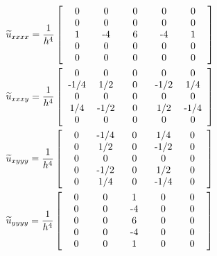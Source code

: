 \documentclass{article}
\begin{document}
\begin{align*}
& \widetilde u_{xxxx}=\frac{1}{h^4}\left[
	\begin{array}{p{0.7cm}<{\centering} p{0.7cm}<{\centering} p{0.7cm}<{\centering}p{0.7cm}<{\centering}p{0.7cm}<{\centering}}
		0&0&0&0&0\\
		0&0&0&0&0\\
		1&-4&6&-4&1\\
		0&0&0&0&0\\
		0&0&0&0&0\\
	\end{array}
	\right]\\
	& \widetilde u_{xxxy}=\frac{1}{h^4}\left[
	\begin{array}{p{0.7cm}<{\centering} p{0.7cm}<{\centering} p{0.7cm}<{\centering}p{0.7cm}<{\centering}p{0.7cm}<{\centering}}
		0&0&0&0&0\\
		-1/4&1/2&0&-1/2&1/4\\
		0&0&0&0&0\\
		1/4&-1/2&0&1/2&-1/4\\
		0&0&0&0&0\\
	\end{array}
	\right]\\
	& \widetilde u_{xyyy}=\frac{1}{h^4}\left[
	\begin{array}{p{0.7cm}<{\centering} p{0.7cm}<{\centering} p{0.7cm}<{\centering}p{0.7cm}<{\centering}p{0.7cm}<{\centering}}
		0&-1/4&0&1/4&0\\
		0&1/2&0&-1/2&0\\
		0&0&0&0&0\\
		0&-1/2&0&1/2&0\\
		0&1/4&0&-1/4&0\\
	\end{array}
	\right]\\
	& \widetilde u_{yyyy}=\frac{1}{h^4}\left[
	\begin{array}{p{0.7cm}<{\centering} p{0.7cm}<{\centering} p{0.7cm}<{\centering}p{0.7cm}<{\centering}p{0.7cm}<{\centering}}
		0&0&1&0&0\\
		0&0&-4&0&0\\
		0&0&6&0&0\\
		0&0&-4&0&0\\
		0&0&1&0&0\\
	\end{array}
	\right]
\end{align*}
\end{document}
